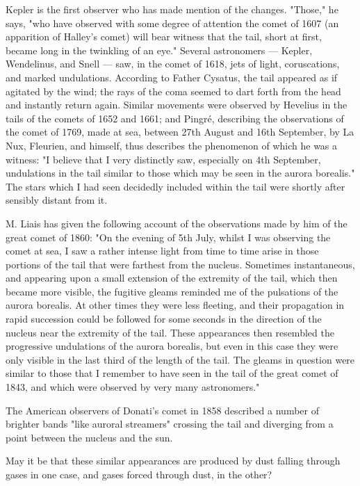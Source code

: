 \documentclass[a4paper, 12pt, oneside, polutonikogreek, english]{article}
\begin{document}
Kepler is the first observer who has made mention of the changes. "Those," he says, "who have observed with some degree of attention the comet of 1607 (an apparition of Halley's comet) will bear witness that the tail, short at first, became long in the twinkling of an eye." Several astronomers --- Kepler, Wendelinus, and Snell --- saw, in the comet of 1618, jets of light, coruscations, and marked undulations. According to Father Cysatus, the tail appeared as if agitated by the wind; the rays of the coma seemed to dart forth from the head and instantly return again. Similar movements were observed by Hevelius in the tails of the comets of 1652 and 1661; and Pingré, describing the observations of the comet of 1769, made at sea, between 27th August and 16th September, by La Nux, Fleurien, and himself, thus describes the phenomenon of which he was a witness: "I believe that I very distinctly saw, especially on 4th September, undulations in the tail similar to those which may be seen in the aurora borealis." The stars which I had seen decidedly included within the tail were shortly after sensibly distant from it.

M. Liais has given the following account of the observations made by him of the great comet of 1860: "On the evening of 5th July, whilst I was observing the comet at sea, I saw a rather intense light from time to time arise in those portions of the tail that were farthest from the nucleus. Sometimes instantaneous, and appearing upon a small extension of the extremity of the tail, which then became more visible, the fugitive gleams reminded me of the pulsations of the aurora borealis. At other times they were less fleeting, and their propagation in rapid succession could be followed for some seconds in the direction of the nucleus near the extremity of the tail. These appearances then resembled the progressive undulations of the aurora borealis, but even in this case they were only visible in the last third of the length of the tail. The gleams in question were similar to those that I remember to have seen in the tail of the great comet of 1843, and which were observed by very many astronomers."

The American observers of Donati's comet in 1858 described a number of brighter bands "like auroral streamers" crossing the tail and diverging from a point between the nucleus and the sun.

May it be that these similar appearances are produced by dust falling through gases in one case, and gases forced through dust, in the other?
\end{document}
